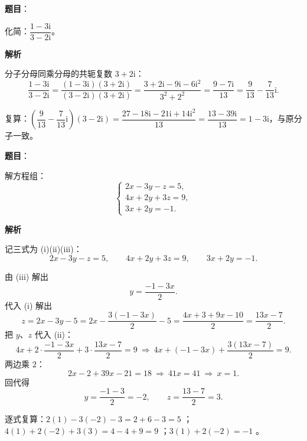 \begin{answer}

\textbf{题目}：

化简：$\dfrac{1-3\mathrm i}{3-2\mathrm i}$。

\textbf{解析}

分子分母同乘分母的共轭复数 $3+2\mathrm i$：
\nopagebreak[4]
\[
\frac{1-3\mathrm i}{3-2\mathrm i}
=\frac{(1-3\mathrm i)(3+2\mathrm i)}{(3-2\mathrm i)(3+2\mathrm i)}
=\frac{3+2\mathrm i-9\mathrm i-6\mathrm i^2}{3^2+2^2}
=\frac{9-7\mathrm i}{13}
=\frac{9}{13}-\frac{7}{13}\mathrm i.
\]

复算：$\left(\dfrac{9}{13}-\dfrac{7}{13}\mathrm i\right)(3-2\mathrm i)=\dfrac{27-18\mathrm i-21\mathrm i+14\mathrm i^2}{13}=\dfrac{13-39\mathrm i}{13}=1-3\mathrm i$，与原分子一致。


\end{answer}
\begin{answer}

\textbf{题目}：

解方程组：
\nopagebreak[4]
\[
\begin{cases}
2x-3y-z=5,\\
4x+2y+3z=9,\\
3x+2y=-1.
\end{cases}
\]

\textbf{解析}

记三式为 (i)(ii)(iii)：
\nopagebreak[4]
\[
2x-3y-z=5,\qquad 4x+2y+3z=9,\qquad 3x+2y=-1.
\]

由 (iii) 解出
\nopagebreak[4]
\[
y=\frac{-1-3x}{2}.
\]
代入 (i) 解出
\nopagebreak[4]
\[
z=2x-3y-5=2x-\frac{3(-1-3x)}{2}-5=\frac{4x+3+9x-10}{2}=\frac{13x-7}{2}.
\]
把 $y$、$z$ 代入 (ii)：
\nopagebreak[4]
\[
4x+2\cdot\frac{-1-3x}{2}+3\cdot\frac{13x-7}{2}=9
\ \Longrightarrow\ 4x+(-1-3x)+\frac{3(13x-7)}{2}=9.
\]
两边乘 $2$：
\nopagebreak[4]
\[
2x-2+39x-21=18\ \Longrightarrow\ 41x=41\ \Longrightarrow\ x=1.
\]
回代得
\nopagebreak[4]
\[
y=\frac{-1-3}{2}=-2,\qquad z=\frac{13-7}{2}=3.
\]

逐式复算：$2(1)-3(-2)-3=2+6-3=5$ ；$4(1)+2(-2)+3(3)=4-4+9=9$ ；$3(1)+2(-2)=-1$ 。


\end{answer}

